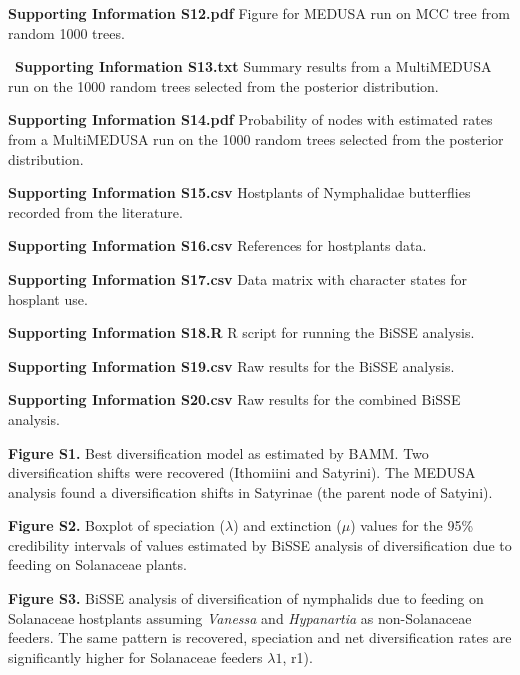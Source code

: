\documentclass[10pt]{article}
\begin{document}
\begin{description}
 \item {\bf Supporting Information S12.pdf} Figure for MEDUSA run on MCC
tree from random 1000 trees.

 \item {\bf Supporting Information S13.txt} Summary results from a
MultiMEDUSA run on the 1000 random trees selected from the posterior
distribution.

 \item {\bf Supporting Information S14.pdf} Probability of nodes with
estimated rates from a MultiMEDUSA run on the 1000 random trees selected
from the posterior distribution.

 \item {\bf Supporting Information S15.csv} Hostplants of Nymphalidae
butterflies recorded from the literature.

 \item {\bf Supporting Information S16.csv} References for hostplants
data.

 \item {\bf Supporting Information S17.csv} Data matrix with character
states for hosplant use.

 \item {\bf Supporting Information S18.R} R script for running the BiSSE
analysis.

 \item {\bf Supporting Information S19.csv} Raw results for the BiSSE
analysis.

 \item {\bf Supporting Information S20.csv} Raw results for the combined
BiSSE analysis.

 \item {\bf Figure S1.} Best diversification model as estimated by BAMM. Two
diversification shifts were recovered (Ithomiini and Satyrini). The MEDUSA 
analysis found a diversification shifts in Satyrinae (the parent node of 
Satyini).

 \item {\bf Figure S2.} Boxplot of speciation ($\lambda$) and extinction
($\mu$) values for the 95\% credibility intervals of values estimated
by BiSSE analysis of diversification due to feeding on Solanaceae
plants.

 \item {\bf Figure S3.} BiSSE analysis of diversification of nymphalids due
to feeding on Solanaceae hostplants assuming \emph{Vanessa} and
\emph{Hypanartia} as non-Solanaceae feeders. The same pattern is
recovered, speciation and net diversification rates are significantly
higher for Solanaceae feeders $\lambda1$, r1).


\end{description}
\end{document}
